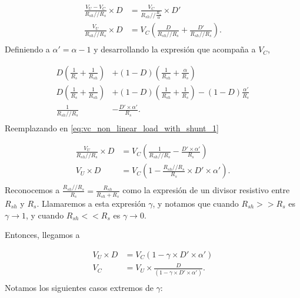 \begin{equation}
    \label{eq:vc_non_linear_load_with_shunt_1}
    \begin{aligned}
        \frac{V_U-V_C}{R_{sh} // R_{s}} \times D &= \frac{V_C}{R_{sh} //
        \frac{R_{s}}{\alpha}} \times D'  \\
        \frac{V_U}{R_{sh} // R_{s}} \times D &= V_C \left( \frac{D}{R_{sh}
        // R_{s}} + \frac{D'}{R_{sh} // R_{s}} \right). \\
    \end{aligned}
\end{equation}
Definiendo a $\alpha'=\alpha-1$ y desarrollando la expresión que acompaña a $V_C$,

\begin{equation}
    \begin{aligned}
        D \left( \frac{1}{R_s} + \frac{1}{R_{sh}} \right) &+ (1-D) \left(
        \frac{1}{R_{sh}} + \frac{\alpha}{R_s} \right) \\
        D \left( \frac{1}{R_s} + \frac{1}{R_{sh}} \right) &+ (1-D) \left(
        \frac{1}{R_{sh}} + \frac{1}{R_s} \right) - (1-D) \frac{\alpha'}{R_s} \\
        \frac{1}{R_{sh} // R_{s}} &- \frac{D' \times \alpha'}{R_s}. \\
    \end{aligned}
\end{equation}
Reemplazando en \ref{eq:vc_non_linear_load_with_shunt_1}

\begin{equation}
    \label{eq:vc_non_linear_load_with_shunt_2}
    \begin{aligned}
        \frac{V_U}{R_{sh} // R_{s}} \times D &= V_C \left( \frac{1}{R_{sh} //
        R_{s}} - \frac{D' \times \alpha'}{R_s} \right) \\
        V_U \times D &= V_C \left( 1 - \frac{R_{sh} // R_{s}}{R_s} \times D'
        \times
        \alpha'\right). \\
    \end{aligned}
\end{equation}
Reconocemos a $\frac{R_{sh} // R_{s}}{R_s} = \frac{R_{sh}}{R_{sh}+R_s}$ como la
expresión de un divisor resistivo entre $R_{sh}$ y $R_s$. Llamaremos a esta
expresión $\gamma$, y notamos que cuando $R_{sh} >> R_s$ es $\gamma \to 1$, y
cuando $R_{sh} << R_s$ es $\gamma \to 0$.

Entonces, llegamos a

\begin{equation}
    \label{eq:vc_non_linear_load_with_shunt_final}
    \begin{aligned}
        V_U \times D &= V_C \left( 1 - \gamma \times D' \times \alpha'\right) \\
        V_C &= V_U \times \frac{D}{\left( 1 - \gamma \times D' \times
        \alpha'\right)}. \\
    \end{aligned}
\end{equation}
Notamos los siguientes casos extremos de $\gamma$:

